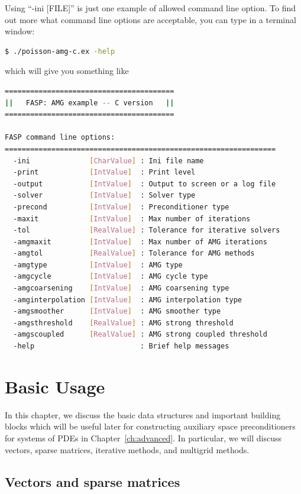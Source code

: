 \documentclass[11pt]{memoir}
\begin{document}
Using ``-ini [FILE]'' is just one example of allowed command line option. To find out more what command line options are acceptable, you can type in a terminal window:
%
\begin{lstlisting}[numbers=none,language=sh]
$ ./poisson-amg-c.ex -help
\end{lstlisting}
%
which will give you something like
%
\begin{lstlisting}[numbers=none,language=sh]
========================================
||   FASP: AMG example -- C version   ||
========================================

FASP command line options:
================================================================
  -ini              [CharValue] : Ini file name
  -print            [IntValue]  : Print level
  -output           [IntValue]  : Output to screen or a log file
  -solver           [IntValue]  : Solver type
  -precond          [IntValue]  : Preconditioner type
  -maxit            [IntValue]  : Max number of iterations
  -tol              [RealValue] : Tolerance for iterative solvers
  -amgmaxit         [IntValue]  : Max number of AMG iterations
  -amgtol           [RealValue] : Tolerance for AMG methods
  -amgtype          [IntValue]  : AMG type
  -amgcycle         [IntValue]  : AMG cycle type
  -amgcoarsening    [IntValue]  : AMG coarsening type
  -amginterpolation [IntValue]  : AMG interpolation type
  -amgsmoother      [IntValue]  : AMG smoother type
  -amgsthreshold    [RealValue] : AMG strong threshold
  -amgscoupled      [RealValue] : AMG strong coupled threshold
  -help                         : Brief help messages
 \end{lstlisting}
%

\chapter{Basic Usage}\label{ch:basic}

In this chapter, we discuss the basic data structures and important building blocks which will be useful later for constructing auxiliary space preconditioners for systems of PDEs in Chapter~\ref{ch:advanced}. In particular, we will discuss vectors, sparse matrices, iterative methods, and multigrid methods.

\section{Vectors and sparse matrices}\label{sec:blas}
\end{document}
